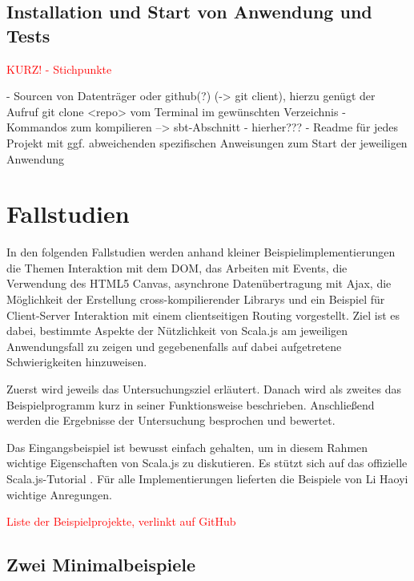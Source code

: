 \documentclass[a4paper, 12pt, hidelinks, listof=totoc, listoftables=totoc, bibliography=totoc]{scrreprt}
\newcommand{\TODO}[1]{\textcolor{red}{#1}\newline}
\begin{document}
\section{Installation und Start von Anwendung und Tests}

\TODO{KURZ! - Stichpunkte}

- Sourcen von Datenträger oder github(?) (-> git client), hierzu genügt der Aufruf git clone <repo> vom Terminal im gewünschten Verzeichnis
- Kommandos zum kompilieren --> sbt-Abschnitt - hierher???
- Readme für jedes Projekt mit ggf. abweichenden spezifischen Anweisungen zum Start der jeweiligen Anwendung


\chapter{Fallstudien}\label{chap:case-studies}

In den folgenden Fallstudien werden anhand kleiner Beispielimplementierungen die Themen Interaktion mit dem \ac{DOM}, das Arbeiten mit Events, die Verwendung des HTML5 Canvas, asynchrone Datenübertragung mit Ajax, die Möglichkeit der Erstellung cross-kompilierender Librarys und ein Beispiel für Client-Server Interaktion mit einem clientseitigen Routing vorgestellt. Ziel ist es dabei, bestimmte Aspekte der Nützlichkeit von Scala.js am jeweiligen Anwendungsfall zu zeigen und gegebenenfalls auf dabei aufgetretene Schwierigkeiten hinzuweisen.

Zuerst wird jeweils das Untersuchungsziel erläutert. Danach wird als zweites das Beispielprogramm kurz in seiner Funktionsweise beschrieben. Anschließend werden die Ergebnisse der Untersuchung besprochen und bewertet.

Das Eingangsbeispiel ist bewusst einfach gehalten, um in diesem Rahmen wichtige Eigenschaften von Scala.js zu diskutieren. Es stützt sich auf das offizielle Scala.js-Tutorial \cite{scalajs.SJT}. Für alle Implementierungen lieferten die Beispiele von Li Haoyi \cite{haoyi.HOS} wichtige Anregungen.

\TODO{Liste der Beispielprojekte, verlinkt auf GitHub}




\section{Zwei Minimalbeispiele}
\end{document}
